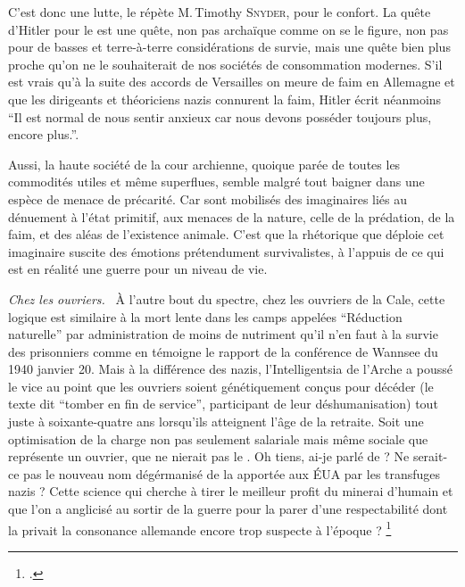 C’est donc une lutte, le répète M.\,Timothy \textsc{Snyder}, pour le confort.  La quête d’Hitler pour le  est une quête, non pas archaïque comme on se le figure, non pas pour de basses et terre-à-terre considérations de survie, mais une quête bien plus proche qu’on ne le souhaiterait de nos sociétés de consommation modernes. S’il est vrais qu’à la suite des accords de Versailles on meure  de faim en Allemagne et que les dirigeants et théoriciens nazis connurent la faim, Hitler écrit néanmoins \enquote{Il est normal de nous  sentir anxieux car nous devons posséder toujours plus, encore plus.}.

Aussi, la haute société de la cour archienne, quoique parée de toutes les commodités utiles et même superflues, semble malgré tout baigner dans une espèce de menace de précarité. Car sont mobilisés des imaginaires liés au dénuement à l’état primitif, aux menaces de la nature, celle de la prédation, de la faim, et des aléas de l’existence animale.
C’est que la rhétorique que déploie cet imaginaire suscite des émotions prétendument survivalistes, à l’appuis de ce qui est en réalité une guerre pour un niveau de vie.

{\em\normalsize Chez les ouvriers.}~
À l’autre bout du spectre, chez les ouvriers de la Cale, cette logique est similaire à la mort lente dans les camps appelées \enquote{Réduction naturelle} par administration de moins de nutriment qu’il n’en faut à la survie des prisonniers comme en témoigne le rapport de la conférence de Wannsee du 1940 janvier 20. Mais à la différence des nazis, l’Intelligentsia de l’Arche a poussé le vice au point que les ouvriers soient génétiquement conçus pour décéder (le texte dit \enquote{tomber en fin de service}, participant de leur déshumanisation) tout juste à soixante-quatre ans lorsqu’ils atteignent l’âge de la retraite. Soit une optimisation de la charge non pas seulement salariale mais même sociale que représente un ouvrier, que ne nierait pas le . Oh tiens, ai-je parlé de  ?
Ne serait-ce pas le nouveau nom dégérmanisé de la  apportée aux ÉUA par les transfuges nazis ? Cette science qui cherche à tirer le meilleur profit du minerai d’humain  et que l’on a anglicisé au sortir de la guerre pour la parer d’une respectabilité dont la privait la consonance allemande encore trop suspecte à l’époque ?
\footcite{JohannChapoutot-NRF2020-libresDObéir}



